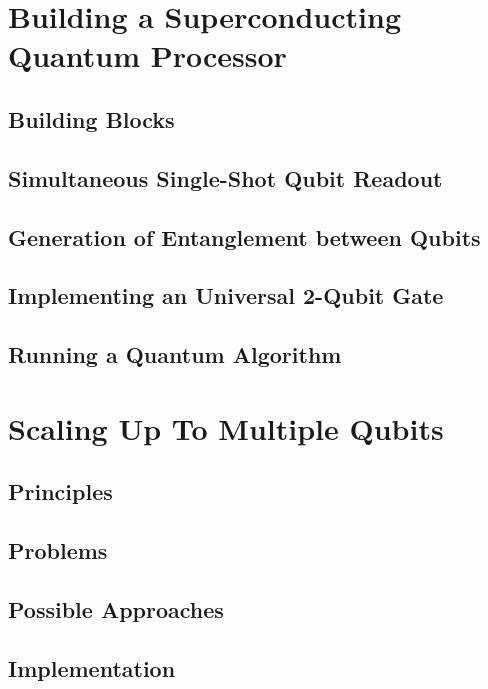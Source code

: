 \section{Building a Superconducting Quantum Processor}

\subsection{Building Blocks}

\subsection{Simultaneous Single-Shot Qubit Readout}

\subsection{Generation of Entanglement between Qubits}

\subsection{Implementing an Universal 2-Qubit Gate}

\subsection{Running a Quantum Algorithm}

\section{Scaling Up To Multiple Qubits}

\subsection{Principles}

\subsection{Problems}

\subsection{Possible Approaches}

\subsection{Implementation}


